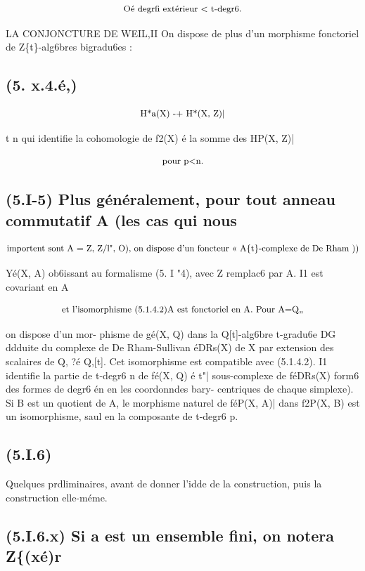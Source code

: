 \documentclass[11pt]{article}
\theoremstyle{remark}
\begin{document}
\[\text{\small Oé degrfi extérieur < t-degr6.}\]

LA CONJONCTURE DE WEIL,II On dispose de plus d'un morphisme fonctoriel de Z\{t\}-alg6bres bigradu6es :

\subsection*{(5. x.4.é,)}

\[\text{\small H*a(X) -+ H*(X, Z)|}\]

t n qui identifie la cohomologie de f2(X) é la somme des HP(X, Z)|

\[\text{\small pour p<n.}\]

\subsection*{(5.I-5) Plus généralement, pour tout anneau commutatif A (les cas qui nous}

\[\text{\small importent sont A = Z, Z/l", O), on dispose d'un foncteur << A\{t\}-complexe de De Rham ))}\]

Yé(X, A) ob6issant au formalisme (5. I "4), avec Z remplac6 par A. I1 est covariant en A

\[\text{\small et l'isomorphisme (5.1.4.2)A est fonctoriel en A. Pour A=Q,,}\]

on dispose d'un mor- phisme de gé(X, Q) dans la Q[t]-alg6bre t-gradu6e DG ddduite du complexe de De Rham-Sullivan éDRs(X) de X par extension des scalaires de Q, ?é Q,[t]. Cet isomorphisme est compatible avec (5.1.4.2). I1 identifie la partie de t-degr6 n de fé(X, Q) é t"| sous-complexe de féDRs(X) form6 des formes de degr6 én en les coordonndes bary- centriques de chaque simplexe). Si B est un quotient de A, le morphisme naturel de féP(X, A)| dans f2P(X, B) est un isomorphisme, saul en la composante de t-degr6 p.

\subsection*{(5.I.6)}

Quelques prdliminaires, avant de donner l'idde de la construction, puis la construction elle-méme.

\subsection*{(5.I.6.x) Si a est un ensemble fini, on notera Z\{(xé)r}
\end{document}
